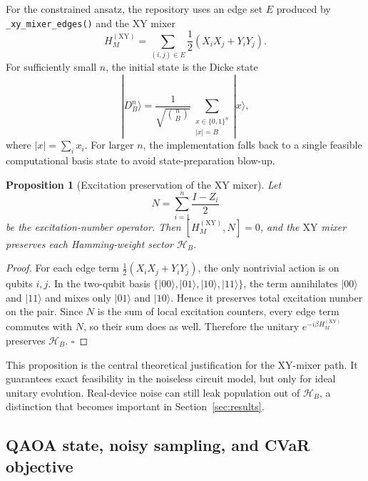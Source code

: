 \documentclass[11pt]{article}
\newtheorem{proposition}{Proposition}
\begin{document}
For the constrained ansatz, the repository uses an edge set \(E\) produced by \texttt{\_xy\_mixer\_edges()} and the \(\mathrm{XY}\) mixer
\begin{equation}
H_M^{(\mathrm{XY})}
= \sum_{(i,j)\in E}\frac{1}{2}\left(X_iX_j + Y_iY_j\right).
\label{eq:xymixer}
\end{equation}
For sufficiently small \(n\), the initial state is the Dicke state
\begin{equation}
|D^n_B\rangle
= \frac{1}{\sqrt{\binom{n}{B}}}
\sum_{\substack{x \in \{0,1\}^n\\|x|=B}} |x\rangle,
\label{eq:dickestate}
\end{equation}
where \(|x|=\sum_i x_i\). For larger \(n\), the implementation falls back to a single feasible computational basis state to avoid state-preparation blow-up.

\begin{proposition}[Excitation preservation of the \(\mathrm{XY}\) mixer]
Let
\begin{equation}
N = \sum_{i=1}^n \frac{I-Z_i}{2}
\label{eq:numberop}
\end{equation}
be the excitation-number operator. Then \([H_M^{(\mathrm{XY})},N]=0\), and the \(\mathrm{XY}\) mixer preserves each Hamming-weight sector \(\mathcal{H}_B\).
\end{proposition}

\begin{proof}
For each edge term \(\frac{1}{2}(X_iX_j+Y_iY_j)\), the only nontrivial action is on qubits \(i,j\). In the two-qubit basis \(\{|00\rangle,|01\rangle,|10\rangle,|11\rangle\}\), the term annihilates \(|00\rangle\) and \(|11\rangle\) and mixes only \(|01\rangle\) and \(|10\rangle\). Hence it preserves total excitation number on the pair. Since \(N\) is the sum of local excitation counters, every edge term commutes with \(N\), so their sum does as well. Therefore the unitary \(e^{-i\beta H_M^{(\mathrm{XY})}}\) preserves \(\mathcal{H}_B\). \(\square\)
\end{proof}

This proposition is the central theoretical justification for the \(\mathrm{XY}\)-mixer path. It guarantees exact feasibility in the noiseless circuit model, but only for ideal unitary evolution. Real-device noise can still leak population out of \(\mathcal{H}_B\), a distinction that becomes important in Section~\ref{sec:results}.

\subsection{QAOA state, noisy sampling, and CVaR objective}
\end{document}
